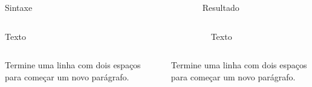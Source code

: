 \documentclass[
]{book}
\begin{document}
\begin{columns}

\begin{column}

Sintaxe

\end{column}

\begin{column}

~

\end{column}

\begin{column}

Resultado

\end{column}

\end{columns}

\begin{columns}

\begin{column}

Texto

\end{column}

\begin{column}

~

\end{column}

\begin{column}

Texto

\end{column}

\end{columns}

\begin{columns}

\begin{column}

Termine uma linha com dois espaços para
começar um novo parágrafo.

\end{column}

\begin{column}

~

\end{column}

\begin{column}

Termine uma linha com dois espaços para começar um novo parágrafo.

\end{column}

\end{columns}
\end{document}
